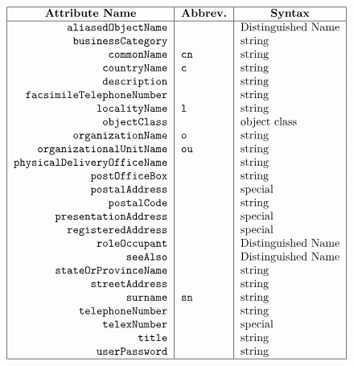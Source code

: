 \begin{bwslide}

\smaller

\[\begin{tabular}{|r|l|l|}
\hline
\multicolumn{1}{|c|}{\bf Attribute Name}&
	\multicolumn{1}{c|}{\bf Abbrev.}&
			\multicolumn{1}{c|}{\bf Syntax}\\
\hline
\verb"aliasedObjectName"&&Distinguished Name\\
\verb"businessCategory"&&string\\
\verb"commonName"&\verb"cn"&string\\
\verb"countryName"&\verb"c"&string\\
\verb"description"&&string\\
\verb"facsimileTelephoneNumber"&&string\\
\verb"localityName"&\verb"l"&string\\
\verb"objectClass"&&object class\\
\verb"organizationName"&\verb"o"&string\\
\verb"organizationalUnitName"&\verb"ou"&string\\
\verb"physicalDeliveryOfficeName"&&string\\
\verb"postOfficeBox"&&string\\
\verb"postalAddress"&&special\\
\verb"postalCode"&&string\\
\verb"presentationAddress"&&special\\
\verb"registeredAddress"&&special\\
\verb"roleOccupant"&&Distinguished Name\\
\verb"seeAlso"&&Distinguished Name\\
\verb"stateOrProvinceName"&&string\\
\verb"streetAddress"&&string\\
\verb"surname"&\verb"sn"&string\\
\verb"telephoneNumber"&&string\\
\verb"telexNumber"&&special\\
\verb"title"&&string\\
\verb"userPassword"&&string\\
\hline
\end{tabular}\]
\end{bwslide}


